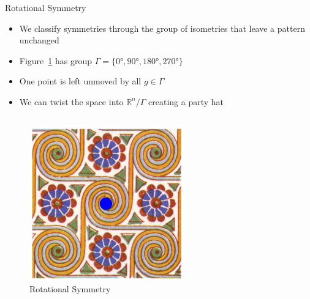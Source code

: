 \documentclass[12pt]{beamer}
\begin{document}
\begin{frame}{Rotational Symmetry}
    \begin{itemize}
        \item We classify symmetries through the group of isometries that
            leave a pattern unchanged
        \item Figure~\ref{fig:rot_sym} has group $\Gamma = \{ \ang{0},
            \ang{90}, \ang{180}, \ang{270} \}$
        \item One point is left unmoved by all $g \in \Gamma$
        \item We can twist the space into $\mathbb{R}^n/\Gamma$ creating a
            party hat
    \end{itemize}
    \begin{columns}
        \begin{column}[c]{0.35\textwidth}
    \begin{figure}
    \includegraphics[width=0.7\textwidth]{images/rotation_with_dot.png}
    \caption{Rotational Symmetry}
    \label{fig:rot_sym}
    \end{figure}
    \end{column}
    \begin{column}[c]{0.3\textwidth}
    \begin{figure}

\end{figure}
\end{column}
\end{columns}
\end{frame}
\end{document}
